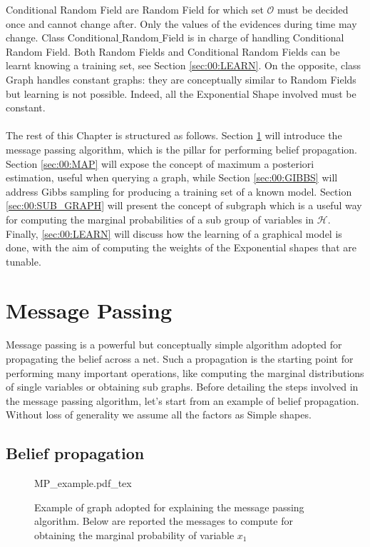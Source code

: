 Conditional Random Field are Random Field for which set $\mathcal{O}$ must be decided once and cannot change after. Only the values of the evidences during time may change. Class Conditional$\_$Random$\_$Field is in charge of handling Conditional Random Field. 
Both Random Fields and Conditional Random Fields can be learnt knowing a training set, see Section \ref{sec:00:LEARN}. On the opposite, class Graph  handles constant graphs: they are conceptually similar to Random Fields but learning is not possible. Indeed, all the Exponential Shape involved must be constant.
\\
\\
The rest of this Chapter is structured as follows. Section \ref{sec:00:MP} will introduce the message passing algorithm, which is the pillar for performing belief propagation. Section \ref{sec:00:MAP} will expose the concept of maximum a posteriori estimation, useful when querying a graph, while Section \ref{sec:00:GIBBS} will address Gibbs sampling for producing a training set of a known model. Section \ref{sec:00:SUB_GRAPH} will present the concept of subgraph which is a useful way for computing the marginal probabilities of a sub group of variables in $\mathcal{H}$. Finally, \ref{sec:00:LEARN} will discuss how the learning of a graphical model is done, with the aim of computing the weights of the Exponential shapes that are tunable.

\section{Message Passing}
\label{sec:00:MP}

Message passing is a powerful but conceptually simple algorithm adopted for propagating the belief across a net. Such a propagation is the starting point for performing many important operations, like computing the marginal distributions of single variables or obtaining sub graphs.
Before detailing the steps involved in the message passing algorithm, let's start from an example of belief propagation.
Without loss of generality we assume all the factors as Simple shapes.

\subsection{Belief propagation}

\begin{figure}
	\centering
\def\svgwidth{0.7 \textwidth}
{MP_example.pdf_tex} 
	\caption{Example of graph adopted for explaining the message passing algorithm. Below are reported the messages to compute for obtaining the marginal probability of variable $x_1$}
	\label{fig:00:example_MP}
\end{figure} 

